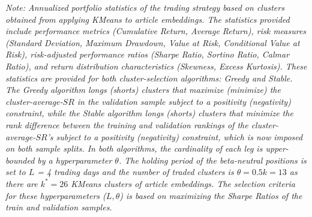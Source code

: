 \documentclass[12pt,article]{memoir}
\begin{document}
\begin{landscape}
\begin{table}[H]
\vspace{0.5cm}
\begin{minipage}{\textwidth}
\setlength{\parindent}{0pt}
\small\textit{Note: 
Annualized portfolio statistics of the trading strategy based on clusters obtained from applying KMeans to article embeddings. The statistics provided include performance metrics (Cumulative Return, Average Return), risk measures (Standard Deviation, Maximum Drawdown, Value at Risk, Conditional Value at Risk), risk-adjusted performance ratios (Sharpe Ratio, Sortino Ratio, Calmar Ratio), and return distribution characteristics (Skewness, Excess Kurtosis). These statistics are provided for both cluster-selection algorithms: Greedy and Stable. The Greedy algorithm longs (shorts) clusters that maximize (minimize) the cluster-average-$SR$ in the validation sample subject to a positivity (negativity) constraint, while the Stable algorithm longs (shorts) clusters that minimize the rank difference between the training and validation rankings of the cluster-average-$SR$'s subject to a positivity (negativity) constraint, which is now imposed on both sample splits. In both algorithms, the cardinality of each leg is upper-bounded by a hyperparameter $\theta$. 
The holding period of the beta-neutral positions is set to $L$ = 4 trading days and the number of traded clusters is $\theta = 0.5k=13$ as there are $k^*=26$ KMeans clusters of article embeddings. The selection criteria for these hyperparameters ($L,\theta$) is based on maximizing the Sharpe Ratios of the train and validation samples.
}
\end{minipage}

\end{table}




\end{landscape}
\end{document}
